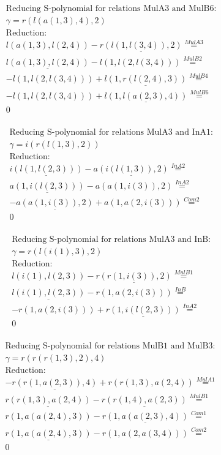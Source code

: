 \documentclass[11pt]{amsart}
\begin{document}
\begin{align*} 
& \text{Reducing S-polynomial for relations MulA3 and MulB6:} \\ 
& \gamma = r(l(a(1,3),4),2) \\ 
& \text{Reduction}: \\&l(a(1,3),l(2,4)) - \underline{r(l(1,l(3,4)),2)} \stackrel{ MulA3 }{=}  \\ 
&\underline{l(a(1,3),l(2,4))} - l(1,l(2,l(3,4))) \stackrel{ MulB2 }{=}  \\ 
& - l(1,l(2,l(3,4))) + \underline{l(1,r(l(2,4),3))} \stackrel{ MulB4 }{=}  \\ 
& - l(1,l(2,l(3,4))) + \underline{l(1,l(a(2,3),4))} \stackrel{ MulB6 }{=}  \\ 
&0\\ 
\end{align*} 
 
\begin{align*} 
& \text{Reducing S-polynomial for relations MulA3 and InA1:} \\ 
& \gamma = i(r(l(1,3),2)) \\ 
& \text{Reduction}: \\&\underline{i(l(1,l(2,3)))} - \underline{a(i(l(1,3)),2)} \stackrel{ InA2 }{=}  \\ 
&\underline{a(1,i(l(2,3)))} - a(a(1,i(3)),2) \stackrel{ InA2 }{=}  \\ 
& - \underline{a(a(1,i(3)),2)} + a(1,a(2,i(3))) \stackrel{ Com2 }{=}  \\ 
&0\\ 
\end{align*} 
 
\begin{align*} 
& \text{Reducing S-polynomial for relations MulA3 and InB:} \\ 
& \gamma = r(l(i(1),3),2) \\ 
& \text{Reduction}: \\&l(i(1),l(2,3)) - \underline{r(r(1,i(3)),2)} \stackrel{ MulB1 }{=}  \\ 
&\underline{l(i(1),l(2,3))} - r(1,a(2,i(3))) \stackrel{ InB }{=}  \\ 
& - r(1,a(2,i(3))) + \underline{r(1,i(l(2,3)))} \stackrel{ InA2 }{=}  \\ 
&0\\ 
\end{align*} 
 
\begin{align*} 
& \text{Reducing S-polynomial for relations MulB1 and MulB3:} \\ 
& \gamma = r(r(r(1,3),2),4) \\ 
& \text{Reduction}: \\& - \underline{r(r(1,a(2,3)),4)} + r(r(1,3),a(2,4)) \stackrel{ MulA1 }{=}  \\ 
&\underline{r(r(1,3),a(2,4))} - \underline{r(r(1,4),a(2,3))} \stackrel{ MulB1 }{=}  \\ 
&r(1,a(a(2,4),3)) - \underline{r(1,a(a(2,3),4))} \stackrel{ Com1 }{=}  \\ 
&\underline{r(1,a(a(2,4),3))} - r(1,a(2,a(3,4))) \stackrel{ Com2 }{=}  \\ 
&0\\ 
\end{align*} 
 
\end{document}
